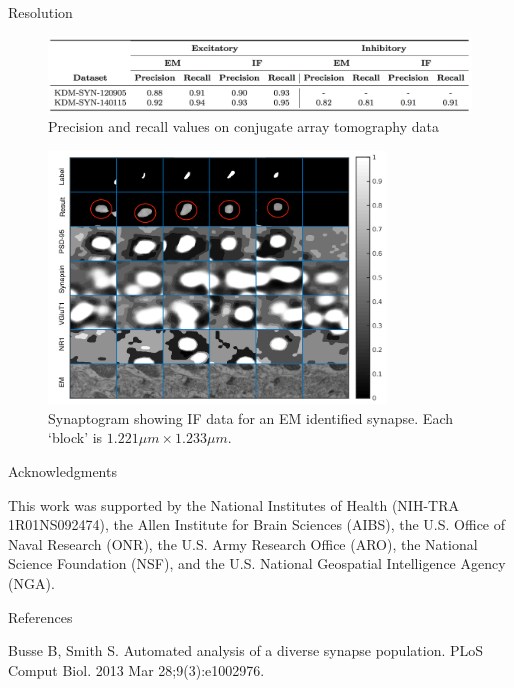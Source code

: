 \documentclass[final, table]{beamer}
\newlength{\onecolwid}
\begin{document}
\begin{frame}[t]
\begin{columns}[t]
\begin{column}{\onecolwid}
\begin{block}{Resolution}
\begin{figure}[!h]
\centering
\includegraphics[width=1\textwidth]{figs/table1}
\caption{Precision and recall values on conjugate array tomography data}
\label{fig:pr_curves}
\end{figure}


\begin{figure}[!h]
\centering
\includegraphics[width=0.8\textwidth]{figs/synaptogramSilane}
\caption{Synaptogram showing IF data for an EM identified synapse.  Each `block' is $1.221 \mu m \times 1.233 \mu m$. }
\label{fig:synaptogramSilane}
\end{figure}






\end{block} 

\begin{block}{Acknowledgments} 

\tiny{This work was supported by the National Institutes of Health (NIH-TRA 1R01NS092474), the Allen Institute for Brain Sciences (AIBS), the U.S. Office of Naval Research (ONR), the U.S. Army Research Office (ARO), the National Science Foundation (NSF), and the U.S. National Geospatial Intelligence Agency (NGA).}
\end{block} 


\vspace{-0.05in}
\begin{block}{References}
\tiny{
\begin{thebibliography}{99}
Busse B, Smith S. Automated analysis of a diverse synapse population. PLoS Comput Biol. 2013 Mar 28;9(3):e1002976.


\end{thebibliography}}
\end{block}
\end{column}
\end{columns}
\end{frame}
\end{document}
